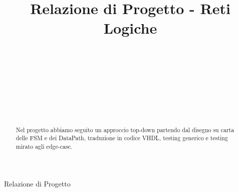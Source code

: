 \documentclass{article}
\begin{document}
\title{Relazione di Progetto - Reti Logiche%
%
}

\author{\\[2pt] 
\\
\\
\and
\\
\\
\\
}

%
%
{Relazione di Progetto} 

\maketitle

\begin{abstract}
Nel progetto abbiamo seguito un approccio top-down partendo dal disegno su carta delle FSM e dei DataPath, traduzione in codice VHDL, testing generico e testing mirato agli edge-case.
\end{abstract}

\end{document}
